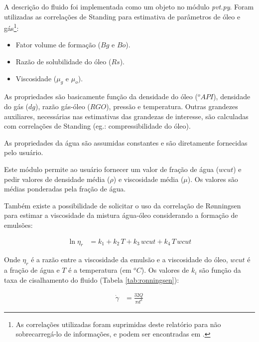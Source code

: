 \documentclass[final,5p]{elsarticle}
\numberwithin{equation}{section}
\begin{document}
        A descrição do fluido foi implementada como um objeto no módulo \emph{pvt.py}. Foram utilizadas as correlações de Standing\cite{standing1952volumetric} para estimativa de parâmetros de óleo e gás\footnote{As correlações utilizadas foram suprimidas deste relatório para não sobrecarregá-lo de informações, e podem ser encontradas em \cite{rosa2006engenharia}.}:

        \begin{itemize}
            \item Fator volume de formação ($Bg$ e $Bo$).
            \item Razão de solubilidade do óleo ($Rs$).
            \item Viscosidade ($\mu_g$ e $\mu_o$).
        \end{itemize}

        As propriedades são basicamente função da densidade do óleo ($^oAPI$), densidade do gás ($dg$), razão gás-óleo ($RGO$), pressão e temperatura. Outras grandezes auxiliares, necessárias nas estimativas das grandezas de interesse, são calculadas com correlações de Standing (eg.: compressibilidade do óleo).

        As propriedades da água são assumidas constantes e são diretamente fornecidas pelo usuário.

        Este módulo permite ao usuário fornecer um valor de fração de água ($wcut$) e pedir valores de densidade média ($\rho$) e viscosidade média ($\mu$). Os valores são médias ponderadas pela fração de água.

        Também existe a possibilidade de solicitar o uso da correlação de Rønningsen para estimar a viscosidade da mistura água-óleo considerando a formação de emulsões\cite{doi:10.1021/ef00041a001}:

        \begin{align}
            \ln \eta_r &= k_1 + k_2 \, T + k_3 \, wcut  + k_4 \, T \, wcut
        \end{align}

        Onde $\eta_r$ é a razão entre a viscosidade da emulsão e a viscosidade do óleo, $wcut$ é a fração de água e $T$ é a temperatura (em $^oC$). Os valores de $k_i$ são função da taxa de cisalhamento do fluido (Tabela \ref{tab:ronningsen}):

        \begin{align}
            \dot{\gamma} &= \frac{32 Q}{\pi d^3}
        \end{align}
\end{document}
